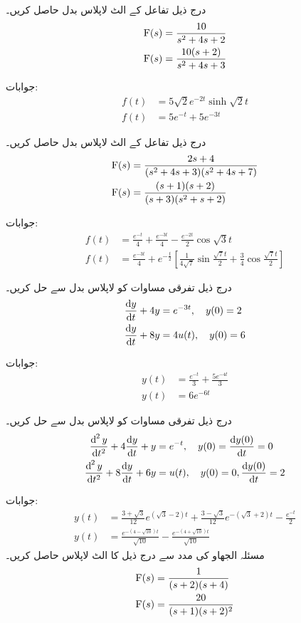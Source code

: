 درج ذیل تفاعل کے الٹ لاپلاس بدل حاصل کریں۔
\begin{align*}
{\ensuremath{{\textup{F}}}}(s)&=\frac{10}{s^2+4s+2}\\
{{\textup{F}}}(s)&=\frac{10(s+2)}{s^2+4s+3}
\end{align*}

جوابات:
\begin{align*}
f(t)&=5\sqrt{2}e^{-2t}\sinh \sqrt{2}t\\
f(t)&=5e^{-t}+5e^{-3t}
\end{align*}

درج ذیل تفاعل کے الٹ لاپلاس بدل حاصل کریں۔
\begin{align*}
{\ensuremath{{\textup{F}}}}(s)&=\frac{2s+4}{(s^2+4s+3)(s^2+4s+7)}\\
{{\textup{F}}}(s)&=\frac{(s+1)(s+2)}{(s+3)(s^2+s+2)}
\end{align*}

جوابات:
\begin{align*}
f(t)&=\frac{e^{-t}}{4}+\frac{e^{-3t}}{4}-\frac{e^{-2t}}{2}\cos \sqrt{3}t\\
f(t)&=\frac{e^{-3t}}{4}+e^{-\frac{t}{2}}\left[\frac{1}{4\sqrt{7}} \sin \frac{\sqrt{7}t}{2}+\frac{3}{4}\cos \frac{\sqrt{7}t}{2}\right]
\end{align*}

درج ذیل تفرقی مساوات کو لاپلاس بدل سے حل کریں۔
\begin{align*}
\frac{\dif y}{\dif t}+4y&=e^{-3t}, \quad y(0)=2\\
\frac{\dif y}{\dif t}+8y&=4u(t), \quad y(0)=6
\end{align*}

جوابات:
\begin{align*}
y(t)&=\frac{e^{-t}}{3}+\frac{5e^{-4t}}{3}\\
y(t)&=6e^{-6t}
\end{align*}

درج ذیل تفرقی مساوات کو لاپلاس بدل سے حل کریں۔
\begin{align*}
\frac{\dif^{\,2}y}{\dif t^2}+4 \frac{\dif y}{\dif t} +y&=e^{-t}, \quad y(0)=\frac{\dif y(0)}{\dif t}=0\\
\frac{\dif^{\,2}y}{\dif t^2}+8 \frac{\dif y}{\dif t} +6y&=u(t), \quad y(0)=0, \frac{\dif y(0)}{\dif t}=2
\end{align*}

جوابات:
\begin{align*}
y(t)&=\frac{3+\sqrt{3}}{12}e^{(\sqrt{3}-2)t}+\frac{3-\sqrt{3}}{12}e^{-(\sqrt{3}+2)t}-\frac{e^{-t}}{2}\\
y(t)&=\frac{e^{-(4-\sqrt{10})t}}{\sqrt{10}}-\frac{e^{-(4+\sqrt{10})t}}{\sqrt{10}}
\end{align*}
مسئلہ الجھاو کی مدد سے درج ذیل کا الٹ لاپلاس حاصل کریں۔
\begin{align*}
{\ensuremath{{\textup{F}}}}(s)&=\frac{1}{(s+2)(s+4)}\\
{{\textup{F}}}(s)&=\frac{20}{(s+1)(s+2)^2}
\end{align*} 

